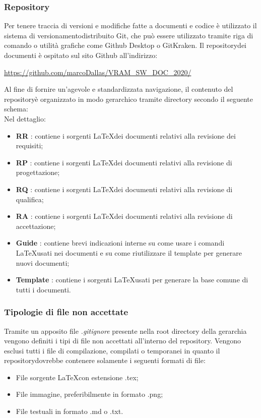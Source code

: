 	\subsubsection{Repository\glosp}
		Per tenere traccia di versioni e modifiche fatte a documenti e codice è utilizzato il sistema di versionamento\glosp distribuito Git, che può essere utilizzato tramite riga di comando o utilità grafiche come Github Desktop o GitKraken.
		Il repository\glosp dei documenti è ospitato sul sito Github all'indirizzo: 
		\begin{center}
			\url{https://github.com/marcoDallas/VRAM_SW_DOC_2020/}
		\end{center}
		Al fine di fornire un'agevole e standardizzata navigazione, il contenuto del repository\glosp è organizzato in modo gerarchico tramite directory secondo il seguente schema:
		\newline
		\mbox{}\\ %
		Nel dettaglio:
		\begin{itemize}
			\item \textbf{RR} : contiene i sorgenti \LaTeX dei documenti relativi alla revisione dei requisiti;
			\item \textbf{RP} : contiene i sorgenti \LaTeX dei documenti relativi alla revisione di progettazione;
			\item \textbf{RQ} : contiene i sorgenti \LaTeX dei documenti relativi alla revisione di qualifica;
			\item \textbf{RA} : contiene i sorgenti \LaTeX dei documenti relativi alla revisione di accettazione; 
			\item \textbf{Guide} : contiene brevi indicazioni interne su come usare i comandi \LaTeX usati nei documenti e su come riutilizzare il template per generare nuovi documenti;
			\item \textbf{Template} : contiene i sorgenti \LaTeX usati per generare la base comune di tutti i documenti.
		\end{itemize}
		
	\subsubsection{Tipologie di file non accettate}
		Tramite un apposito file \textit{.gitignore} presente nella root directory della gerarchia vengono definiti i tipi di file non accettati all'interno del repository\glo. Vengono esclusi tutti i file di compilazione, compilati o temporanei in quanto il repository\glosp dovrebbe contenere solamente i seguenti formati di file:
		\begin{itemize}
			\item File sorgente \LaTeX con estensione .tex;
			\item File immagine, preferibilmente in formato .png;
			\item File testuali in formato .md o .txt.			
		\end{itemize}
	
